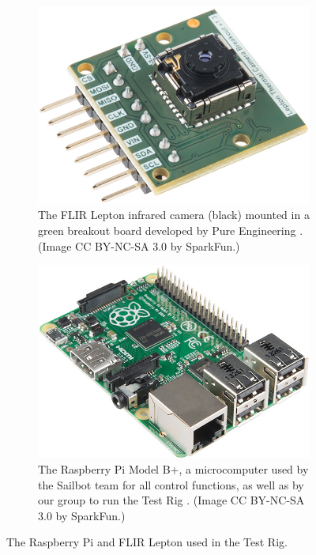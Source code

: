 \begin{figure}
\centering

\begin{subfigure}{.50\textwidth}
\centering
\includegraphics[width=.90\linewidth]{"./image/lepton"}
\caption[FLIR Lepton]{\label{fig:lepton}The FLIR Lepton infrared camera (black) mounted in a green breakout board developed by Pure Engineering \cite{pure-eng}. (Image CC BY-NC-SA 3.0 by SparkFun.)}
\end{subfigure}%
\begin{subfigure}{.50\textwidth}
\centering
\includegraphics[width=.90\linewidth]{"./image/raspberry-pi"}
\caption[Raspberry Pi]{\label{fig:rpi}The Raspberry Pi Model B+, a microcomputer used by the Sailbot team for all control functions, as well as by our group to run the Test Rig \cite{rpi}. (Image CC BY-NC-SA 3.0 by SparkFun.)}
\end{subfigure}

\caption[Equipment used in the Test Rig.]{\label{fig:rpi-lepton}The Raspberry Pi and FLIR Lepton used in the Test Rig.}

\end{figure}

